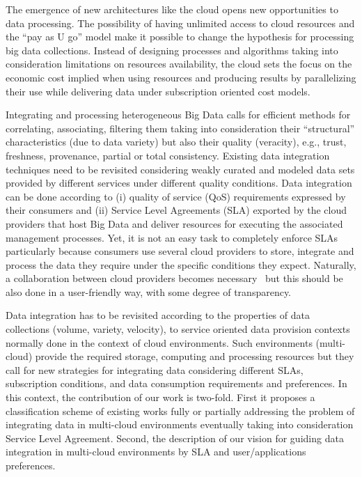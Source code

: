 The emergence of new architectures like the cloud opens new opportunities to data processing. 
The possibility of having unlimited access to cloud resources and the ``pay as U go'' model make it possible to change the hypothesis for processing big  data collections.  Instead of designing processes and algorithms taking into consideration  limitations on resources availability, the cloud sets the focus on the economic cost implied when using resources and producing results by parallelizing their use while delivering data under subscription oriented cost models.
 
Integrating and processing heterogeneous Big Data calls for efficient methods for correlating, associating, filtering them taking into consideration their ``structural'' characteristics (due to data variety) but also their quality (veracity), e.g., trust, freshness, provenance, partial or total consistency. 
Existing data integration techniques need to be revisited considering weakly curated and modeled data sets provided by different services under different quality conditions. Data integration can be done according to  (i) quality of service (QoS) requirements expressed by their consumers and (ii) Service Level Agreements (SLA)  exported by the cloud providers that host  Big Data and deliver resources for executing the associated management processes. Yet, it is not an easy task to completely enforce SLAs particularly because consumers use several cloud providers to store, integrate and process the data they require under the specific conditions they expect.
Naturally, a collaboration between cloud providers becomes necessary~\cite{036} but this should be also done in a user-friendly way, with some degree of transparency. 


Data integration has to be revisited according to  the properties of data collections (volume, variety, velocity), to service oriented data provision contexts normally done in the context of cloud environments. Such environments (multi-cloud)  provide the required storage, computing and processing resources but they call for new strategies for integrating data considering different SLAs, subscription conditions, and data consumption requirements and preferences. In this context, the contribution of our work is two-fold. First it proposes a classification scheme of existing works fully or partially addressing the problem of integrating data in multi-cloud environments eventually taking into consideration Service Level Agreement. Second, the description of our vision  for guiding data integration in multi-cloud environments  by SLA and user/applications preferences. 

